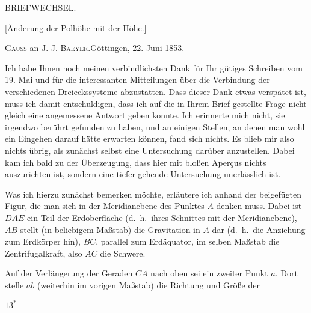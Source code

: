 \clearpage
\begin{center}
{\Large BRIEFWECHSEL.}\par\vspace{10mm}
{\large [Änderung der Polhöhe mit der Höhe.]}\par\vspace{8mm}
\textsc{Gauss} an \textsc{J. J. Baeyer}.\quad Göttingen, 22. Juni 1853.
\end{center}
Ich habe Ihnen noch meinen verbindlichsten Dank für Ihr gütiges Schreiben vom 19. Mai und für die interessanten Mitteilungen über die Verbindung der verschiedenen Dreieckssysteme abzustatten. Dass dieser Dank etwas verspätet ist, muss ich damit entschuldigen, dass ich auf die in Ihrem Brief gestellte Frage nicht gleich eine angemessene Antwort geben konnte. Ich erinnerte mich nicht, sie irgendwo berührt gefunden zu haben, und an einigen Stellen, an denen man wohl ein Eingehen darauf hätte erwarten können, fand sich nichts. Es blieb mir also nichts übrig, als zunächst selbst eine Untersuchung darüber anzustellen. Dabei kam ich bald zu der Überzeugung, dass hier mit bloßen Aperçus nichts auszurichten ist, sondern eine tiefer gehende Untersuchung unerlässlich ist.

Was ich hierzu zunächst bemerken möchte, erläutere ich anhand der beigefügten Figur, die man sich in der Meridianebene des Punktes $A$ denken muss. Dabei ist $DAE$ ein Teil der Erdoberfläche (d.\ h.\ ihres Schnittes mit der Meridianebene), $AB$ stellt (in beliebigem Maßstab) die Gravitation in $A$ dar (d.\ h.\ die Anziehung zum Erdkörper hin), $BC$, parallel zum Erdäquator, im selben Maßstab die Zentrifugalkraft, also $AC$ die Schwere.

Auf der Verlängerung der Geraden $CA$ nach oben sei ein zweiter Punkt $a$. Dort stelle $ab$ (weiterhin im vorigen Maßstab) die Richtung und Größe der
\par\noindent\hfill $13^{*}$\par

